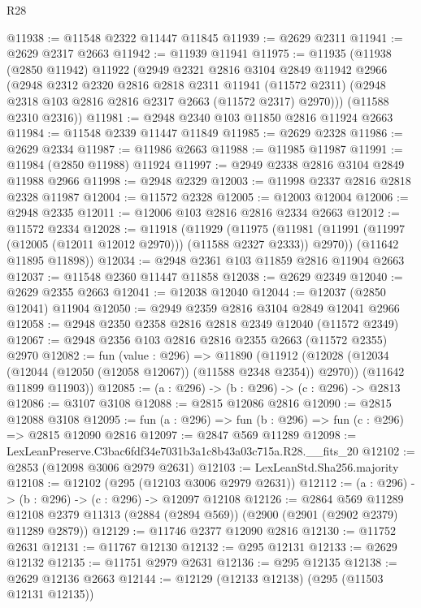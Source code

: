 \begin{lexlean}{R28}
\begin{coremodule}
@11938 := @11548 @2322 @11447 @11845
@11939 := @2629 @2311
@11941 := @2629 @2317 @2663
@11942 := @11939 @11941
@11975 := @11935
    (@11938
      (@2850 @11942)
      @11922
      (@2949
        @2321
        @2816
        @3104
        @2849
        @11942
        @2966
        (@2948
          @2312
          @2320
          @2816
          @2818
          @2311
          @11941
          (@11572 @2311)
          (@2948 @2318 @103 @2816 @2816 @2317 @2663 (@11572 @2317) @2970)))
      (@11588 @2310 @2316))
@11981 := @2948 @2340 @103 @11850 @2816 @11924 @2663
@11984 := @11548 @2339 @11447 @11849
@11985 := @2629 @2328
@11986 := @2629 @2334
@11987 := @11986 @2663
@11988 := @11985 @11987
@11991 := @11984 (@2850 @11988) @11924
@11997 := @2949 @2338 @2816 @3104 @2849 @11988 @2966
@11998 := @2948 @2329
@12003 := @11998 @2337 @2816 @2818 @2328 @11987
@12004 := @11572 @2328
@12005 := @12003 @12004
@12006 := @2948 @2335
@12011 := @12006 @103 @2816 @2816 @2334 @2663
@12012 := @11572 @2334
@12028 := @11918
    (@11929
      (@11975 (@11981 (@11991 (@11997 (@12005 (@12011 @12012 @2970))) (@11588 @2327 @2333)) @2970))
      (@11642 @11895 @11898))
@12034 := @2948 @2361 @103 @11859 @2816 @11904 @2663
@12037 := @11548 @2360 @11447 @11858
@12038 := @2629 @2349
@12040 := @2629 @2355 @2663
@12041 := @12038 @12040
@12044 := @12037 (@2850 @12041) @11904
@12050 := @2949 @2359 @2816 @3104 @2849 @12041 @2966
@12058 := @2948 @2350 @2358 @2816 @2818 @2349 @12040 (@11572 @2349)
@12067 := @2948 @2356 @103 @2816 @2816 @2355 @2663 (@11572 @2355) @2970
@12082 := fun (value : @296) =>
  @11890
    (@11912
      (@12028 (@12034 (@12044 (@12050 (@12058 @12067)) (@11588 @2348 @2354)) @2970))
      (@11642 @11899 @11903))
@12085 := (a : @296) -> (b : @296) -> (c : @296) -> @2813
@12086 := @3107 @3108
@12088 := @2815 @12086 @2816
@12090 := @2815 @12088 @3108
@12095 := fun (a : @296) => fun (b : @296) => fun (c : @296) => @2815 @12090 @2816
@12097 := @2847 @569 @11289
@12098 := LexLeanPreserve.C3bac6fdf34e7031b3a1c8b43a03c715a.R28.__fits_20
@12102 := @2853 (@12098 @3006 @2979 @2631)
@12103 := LexLeanStd.Sha256.majority
@12108 := @12102 (@295 (@12103 @3006 @2979 @2631))
@12112 := (a : @296) -> (b : @296) -> (c : @296) -> @12097 @12108
@12126 := @2864
    @569
    @11289
    @12108
    @2379
    @11313
    (@2884 (@2894 @569))
    (@2900 (@2901 (@2902 @2379) @11289 @2879))
@12129 := @11746 @2377 @12090 @2816
@12130 := @11752 @2631
@12131 := @11767 @12130
@12132 := @295 @12131
@12133 := @2629 @12132
@12135 := @11751 @2979 @2631
@12136 := @295 @12135
@12138 := @2629 @12136 @2663
@12144 := @12129 (@12133 @12138) (@295 (@11503 @12131 @12135))

\end{coremodule}
\end{lexlean}
